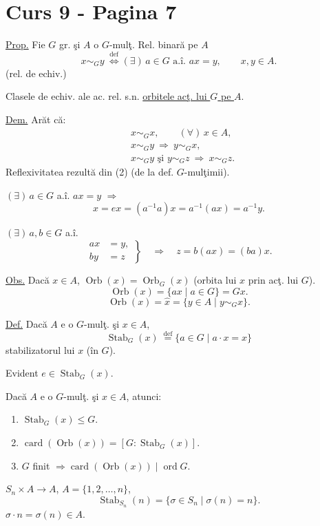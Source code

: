
\section*{Curs 9 - Pagina 7}

\noindent\underline{Prop.} Fie $G$ gr. şi $A$ o $G$-mulţ. Rel. binară pe $A$
\[
x\sim_G y\ \overset{\mathrm{def}}{\Longleftrightarrow}
(\exists)\,a\in G\text{ a.î. }a x=y,\qquad x,y\in A.
\]
\noindent (rel. de echiv.)

\bigskip
\noindent Clasele de echiv. ale ac. rel. s.n. \underline{orbitele acţ. lui $G$ pe $A$}.

\bigskip
\noindent\underline{Dem.} Arăt că:
\begin{align*}
&x\sim_G x,\qquad (\forall)\,x\in A,\\
&x\sim_G y\ \Longrightarrow\ y\sim_G x,\\
&x\sim_G y\text{ şi }y\sim_G z\ \Longrightarrow\ x\sim_G z.
\end{align*}
\noindent Reflexivitatea rezultă din (2) (de la def. $G$-mulţimii).

\bigskip
\noindent $(\exists)\,a\in G$ a.î. $a x=y$ $\Longrightarrow$
\[
x=e x=(a^{-1}a)x=a^{-1}(a x)=a^{-1}y.
\]

\bigskip
\noindent $(\exists)\,a,b\in G$ a.î.
\[
\left.\begin{aligned}
 a x&=y,\\
 b y&=z
\end{aligned}\right\}
\quad\Longrightarrow\quad z=b(a x)=(ba)x.
\]

\bigskip
\noindent\underline{Obs.} Dacă $x\in A$, $\operatorname{Orb}(x)=\operatorname{Orb}_G(x)$
(orbita lui $x$ prin acţ. lui $G$).
\[
\operatorname{Orb}(x)=\{a x\mid a\in G\}=Gx.
\]
\[
\operatorname{Orb}(x)=\widehat{x}
=\{y\in A\mid y\sim_G x\}.
\]

\bigskip
\noindent\underline{Def.} Dacă $A$ e o $G$-mulţ. şi $x\in A$,
\[
\operatorname{Stab}_G(x)\ \overset{\mathrm{def}}{=}
\{a\in G\mid a\cdot x=x\}
\]
\noindent stabilizatorul lui $x$ (în $G$).

\noindent Evident $e\in\operatorname{Stab}_G(x)$.

\bigskip
\noindent{} Dacă $A$ e o $G$-mulţ. şi $x\in A$, atunci:
\begin{enumerate}
\item[(1)] $\operatorname{Stab}_G(x)\leq G$.
\item[(2)] $\operatorname{card}(\operatorname{Orb}(x))
=[G:\operatorname{Stab}_G(x)]$.
\item[(3)] $G$ finit $\Longrightarrow\operatorname{card}(\operatorname{Orb}(x))\mid\operatorname{ord}G$.
\end{enumerate}

\bigskip
\noindent $S_n\times A\longrightarrow A$, \qquad $A=\{1,2,\ldots,n\}$,
\[
\operatorname{Stab}_{S_n}(n)
=\{\sigma\in S_n\mid\sigma(n)=n\}.
\]
\noindent $\sigma\cdot n=\sigma(n)\in A$.
